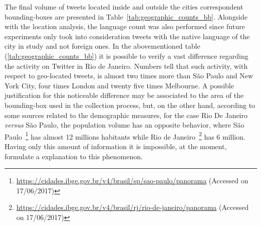 The final volume of tweets located inside and outside the cities correspondent bounding-boxes are presented in Table~\ref{tab:geographic_counts_bb}. Alongside with the location analysis, the language count was also performed since future experiments only took into consideration tweets with the native language of the city in study and not foreign ones. In the abovementioned table (\ref{tab:geographic_counts_bb}) it is possible to verify a vast difference regarding the activity on Twitter in Rio de Janeiro. Numbers tell that such activity, with respect to geo-located tweets, is almost two times more than São Paulo and New York City, four times London and twenty five times Melbourne. A possible justification for this noticeable difference may be associated to the area of the bounding-box used in the collection process, but, on the other hand, according to some sources related to the demographic measures, for the case Rio De Janeiro \textit{versus} São Paulo, the population volume has an opposite behavior, where São Paulo~\footnote{\url{https://cidades.ibge.gov.br/v4/brasil/sp/sao-paulo/panorama} (Accessed on 17/06/2017)} has almost 12 millions habitants while Rio de Janeiro~\footnote{\url{https://cidades.ibge.gov.br/v4/brasil/rj/rio-de-janeiro/panorama} (Accessed on 17/06/2017)} has 6 million. Having only this amount of information it is impossible, at the moment, formulate a explanation to this phenomenon.

